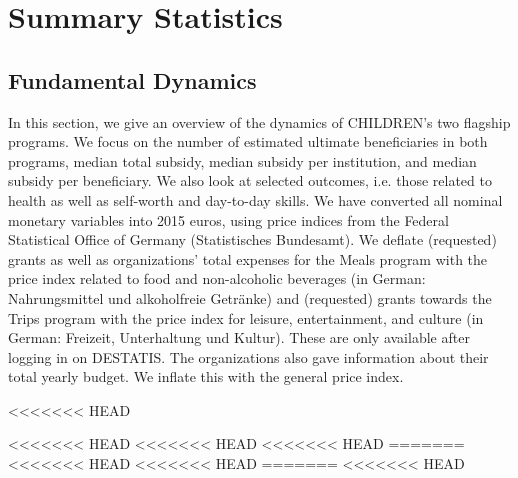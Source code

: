 \documentclass[12pt, a4paper, titlepage]{article}\usepackage[]{graphicx}\usepackage[]{color}
\begin{document}
\section{Summary Statistics}
\subsection{Fundamental Dynamics} 

In this section, we give an overview of the dynamics of CHILDREN's two flagship programs. We focus on the number of estimated ultimate beneficiaries in both programs, median total subsidy, median subsidy per institution, and median subsidy per beneficiary. We also look at selected outcomes, i.e. those related to health as well as self-worth and day-to-day skills. We have converted all nominal monetary variables into 2015 euros, using price indices from the Federal Statistical Office of Germany (Statistisches Bundesamt). We deflate (requested) grants as well as organizations' total expenses for the Meals program  with the price index related to food and non-alcoholic beverages (in German: Nahrungsmittel und alkoholfreie Getränke) and (requested) grants towards the Trips program with the price index for leisure, entertainment, and culture (in German: Freizeit, Unterhaltung und Kultur). These are only available after logging in on DESTATIS. The organizations also gave information about their total yearly budget. We inflate this with the general price index.


<<<<<<< HEAD

<<<<<<< HEAD
<<<<<<< HEAD
<<<<<<< HEAD
=======
<<<<<<< HEAD
<<<<<<< HEAD
=======
<<<<<<< HEAD

\begin{table}[!htbp] \centering 
  \caption{} 
  \label{fundamentalDynamics} 
\end{table} 
\end{document}
